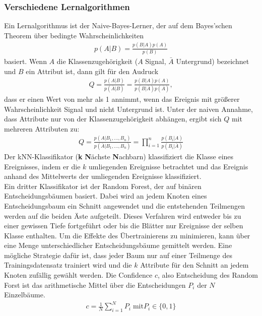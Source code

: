 \subsubsection{Verschiedene Lernalgorithmen}
Ein Lernalgorithmus ist der Naive-Bayes-Lerner, der auf dem Bayes'schen Theorem über bedingte Wahrscheinlichkeiten 
\begin{align}
	p(A|B) = \frac{p(B|A)p(A)}{p(B)}
\end{align}
basiert. Wenn $A$ die Klassenzugehörigkeit ($A$ Signal, $\bar{A}$ Untergrund) bezeichnet und $B$ ein Attribut ist, dann gilt für den Audruck
\begin{align}
	Q = \frac{p(A|B)}{p(\bar{A}|B)} = \frac{p(B|A)p(A)}{p(B|\bar{A})p(\bar{A})},
\end{align}
dass er einen Wert von mehr als 1 annimmt, wenn das Ereignis mit größerer Wahrscheinlichkeit Signal und nicht Untergrund ist. Unter der naiven Annahme, dass Attribute nur von der Klassenzugehörigkeit abhängen, ergibt sich $Q$ mit mehreren Attributen zu:\\
\begin{align}
	Q = \frac{p(A|B_{1},...,B_{n})}{p(\bar{A}|B_{1},...,B_{n})} = \prod_{i=1}^{n} \frac{p(B_{i}|A)}{p(B_{i}|\bar{A})}
\end{align}
Der kNN-Klassifikator (\textbf{k} \textbf{N}ächste \textbf{N}achbarn) klassifiziert die Klasse eines Ereignisses, indem er die $k$ umliegenden Ereignisse betrachtet und das Ereignis anhand des Mittelwerts der umliegenden Ereignisse klassifiziert.\\
Ein dritter Klassifikator ist der Random Forest, der auf binären Entscheidungsbäumen basiert. Dabei wird an jedem Knoten eines Entscheidungsbaum ein Schnitt angewendet und die entstehenden Teilmengen werden auf die beiden Äste aufgeteilt. Dieses Verfahren wird entweder bis zu einer gewissen Tiefe fortgeführt oder bis die Blätter nur Ereignisse der selben Klasse enthalten.
Um die Effekte des Übertrainierens zu minimieren, kann über eine Menge unterschiedlicher Entscheidungsbäume gemittelt werden. Eine mögliche Strategie dafür ist, dass jeder Baum nur auf einer Teilmenge des Trainingsdatensatz trainiert wird und die $k$ Attribute für den Schnitt an jedem Knoten zufällig gewählt werden. Die Confidence $c$, also Entscheidung des Random Forst ist das arithmetische Mittel über die Entscheidungen $P_{i}$ der $N$ Einzelbäume.
\begin{align}
	c = \frac{1}{N} \sum_{i=1}^{N}P_{i} \; \text{mit} P_{i} \in \{0,1\}
\end{align}
